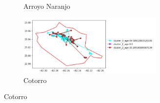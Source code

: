 \begin{figure}[h!]
\begin{subfigure}[b]{0.49\linewidth}
		\caption{Arroyo Naranjo}
		\label{fig:Arroyo}
	\end{subfigure}
	\begin{subfigure}[b]{0.49\linewidth}
		\includegraphics[width=\linewidth, height=3cm]{Images/Cotorro.png}
		\caption{Cotorro}
		\label{fig:Cotorro}
	\end{subfigure}
	
	\label{fig:RestoMunicipios1}
\end{figure}
